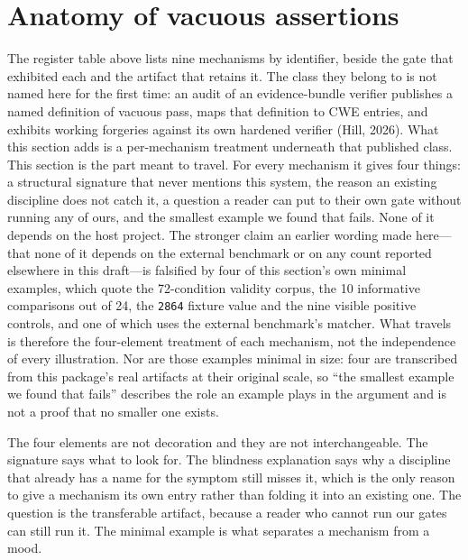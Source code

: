 \documentclass[11pt]{article}
\begin{document}
\section{Anatomy of vacuous assertions}
\label{sec:anatomy}
The register table above lists nine mechanisms by identifier, beside the gate that exhibited each and the artifact that retains it. The class they belong to is not named here for the first time: an audit of an evidence-bundle verifier publishes a named definition of vacuous pass, maps that definition to CWE entries, and exhibits working forgeries against its own hardened verifier (Hill, 2026). What this section adds is a per-mechanism treatment underneath that published class. This section is the part meant to travel. For every mechanism it gives four things: a structural signature that never mentions this system, the reason an existing discipline does not catch it, a question a reader can put to their own gate without running any of ours, and the smallest example we found that fails. None of it depends on the host project. The stronger claim an earlier wording made here---that none of it depends on the external benchmark or on any count reported elsewhere in this draft---is falsified by four of this section's own minimal examples, which quote the 72-condition validity corpus, the 10 informative comparisons out of 24, the \texttt{2864} fixture value and the nine visible positive controls, and one of which uses the external benchmark's matcher. What travels is therefore the four-element treatment of each mechanism, not the independence of every illustration. Nor are those examples minimal in size: four are transcribed from this package's real artifacts at their original scale, so ``the smallest example we found that fails'' describes the role an example plays in the argument and is not a proof that no smaller one exists.

The four elements are not decoration and they are not interchangeable. The signature says what to look for. The blindness explanation says why a discipline that already has a name for the symptom still misses it, which is the only reason to give a mechanism its own entry rather than folding it into an existing one. The question is the transferable artifact, because a reader who cannot run our gates can still run it. The minimal example is what separates a mechanism from a mood.
\end{document}
